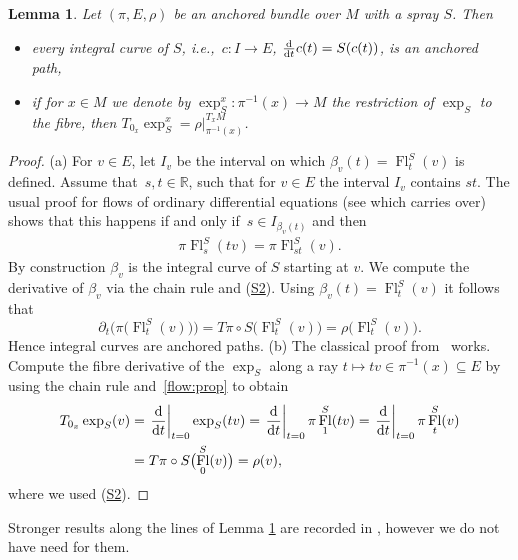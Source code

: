 \documentclass[11pt]{article}
\numberwithin{equation}{section}
\numberwithin{equation}{section}
\newtheorem{Lemma}[Theorem]{Lemma}
\newcommand{\R}{\ensuremath{\mathbb{R}}}
\DeclareMathOperator{\Fl}{Fl}
\begin{document}
\begin{Lemma}\label{lem:spec_curv}
Let $(\pi, E,\rho)$ be an anchored bundle over $M$ with a spray $S$. Then
\begin{itemize}\itemsep=0pt
\item[$(a)$] every integral curve of $S$, i.e.,~$c \colon I \rightarrow E$, $\frac{{\rm d}}{{\rm d}t}c(t)=S(c(t))$, is an anchored path,
\item[$(b)$] if for $x \in M$ we denote by $\exp_S^x \colon \pi^{-1}(x)\rightarrow M$ the restriction of $\exp_S$ to the fibre, then $T_{0_x} \exp_S^x = \rho|_{\pi^{-1}(x)}^{T_xM}$.
\end{itemize}
\end{Lemma}

\begin{proof}
(a) For $v \in E$, let $I_v$ be the interval on which $\beta_v (t)= \Fl_{t}^S(v)$ is defined. Assume that~${s,t \in \R}$, such that for $v \in E$ the interval $I_v$ contains $st$.
The usual proof for flows of ordinary differential equations (see \cite[p.~106]{La01} which carries over) shows that this happens if and only if~${s \in I_{\beta_v(t)}}$ and then
\begin{align}
\pi\Fl_{s}^S(tv)= \pi \Fl^S_{st}(v).\label{flow:prop}
\end{align}
By construction $\beta_v$ is the integral curve of $S$ starting at $v$.
We compute the derivative of $\beta_v$ via the chain rule and (\hyperlink{sprayS2}{S2}).
Using {$\beta_v (t)=\Fl^S_t (v)$} it follows that
\begin{displaymath}
 \partial_t \bigl(\pi\bigl(\Fl^S_t (v)\bigr)\bigr) = T\pi \circ S \bigl(\Fl^S_t (v)\bigr) = \rho \bigl(\Fl^S_t (v)\bigr).\end{displaymath}
Hence integral curves are anchored paths.
(b) The classical proof from~\cite{La01} works. Compute the fibre derivative of the $\exp_S$ along a ray $t\mapsto tv \in \pi^{-1}(x) \subseteq E$ by using the chain rule and~\eqref{flow:prop} to obtain
\begin{align*}
T_{0_x}\exp_S (v)&=\left.\frac{{\rm d}}{{\rm d}t}\right|_{t=0} \exp_S (tv)= \left. \frac{{\rm d}}{{\rm d}t}\right|_{t=0} \pi \Fl^{S}_{1}(tv) = \left. \frac{{\rm d}}{{\rm d}t}\right|_{t=0} \pi \Fl^{S}_{t}(v) \\
&=T\pi \circ S\bigl(\Fl_0^S(v)\bigr) =\rho (v),
\end{align*}
where we used (\hyperlink{sprayS2}{S2}).
\end{proof}

Stronger results along the lines of Lemma \ref{lem:spec_curv} are recorded in \cite{ana11}, however we do not have need for them.
\end{document}
